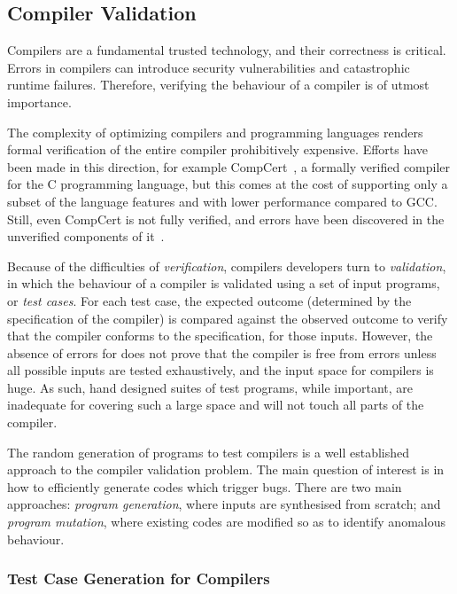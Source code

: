\subsection{Compiler Validation}

Compilers are a fundamental trusted technology, and their correctness is critical. Errors in compilers can introduce security vulnerabilities and catastrophic runtime failures. Therefore, verifying the behaviour of a compiler is of utmost importance.

The complexity of optimizing compilers and programming languages renders formal verification of the entire compiler prohibitively expensive. Efforts have been made in this direction, for example CompCert~\cite{Leroy2013}, a formally verified compiler for the C programming language, but this comes at the cost of supporting only a subset of the language features and with lower performance compared to GCC. Still, even CompCert is not fully verified, and errors have been discovered in the unverified components of it~\cite{Yang2011}.

Because of the difficulties of \emph{verification}, compilers developers turn to \emph{validation}, in which the behaviour of a compiler is validated using a set of input programs, or \emph{test cases}. For each test case, the expected outcome (determined by the specification of the compiler) is compared against the observed outcome to verify that the compiler conforms to the specification, for those inputs. However, the absence of errors for does not prove that the compiler is free from errors unless all possible inputs are tested exhaustively, and the input space for compilers is huge. As such, hand designed suites of test programs, while important, are inadequate for covering such a large space and will not touch all parts of the compiler.

The random generation of programs to test compilers is a well established approach to the compiler validation problem. The main question of interest is in how to efficiently generate codes which trigger bugs. There are two main approaches: \emph{program generation}, where inputs are synthesised from scratch; and \emph{program mutation}, where existing codes are modified so as to identify anomalous behaviour.


\subsubsection{Test Case Generation for Compilers}

